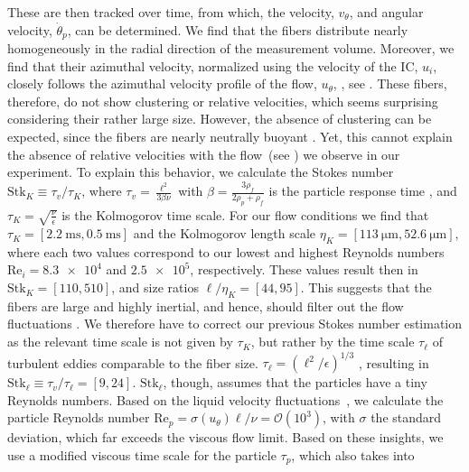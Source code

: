 These are then tracked over time,
from which, the velocity, $v_\theta$, and angular velocity,
$\dot{\theta}_p$, can be determined. We find that the fibers distribute nearly
homogeneously in the radial direction of the measurement volume. Moreover, we find that their
azimuthal velocity, normalized using the velocity of the IC,
$u_i$, closely follows the azimuthal velocity profile of the flow, $u_\theta$,
\cite{Huisman2013}, see . These fibers, therefore,
do not show clustering or relative velocities, which seems surprising
considering their rather large size.  However, the absence of clustering can
be expected, since the fibers are nearly neutrally buoyant
\cite{Calzavarini2008, Calzavarini2009, Fiabane2012}. Yet, this cannot explain
the absence of relative velocities with the flow~(see
) we observe in our experiment. To explain this
behavior, we calculate the Stokes number $\text{Stk}_K \equiv \tau_v/\tau_K$,
where $\tau_v = \frac{\ell^2}{3 \beta \nu}$ with $\beta =
\frac{3\rho_f}{2\rho_p + \rho_f}$ is the particle response time
\cite{Qureshi2007}, and $\tau_K = \sqrt{\frac{\nu}{\epsilon}}$ is the
Kolmogorov time scale. For our flow conditions we find that $\tau_K =
[\SI{2.2}{\milli\second},\SI{0.5}{\milli\second}]$ and the Kolmogorov length
scale $\eta_K = [\SI{113}{\micro\metre},\SI{52.6}{\micro\metre}]$, where each
two values correspond to our lowest and highest Reynolds numbers $\text{Re}_i
= \num{8.3e4}$ and $\num{2.5e5}$, respectively. These values result then in
$\text{Stk}_K = [110, 510]$, and size ratios $\ell/\eta_K = [44, 95]$. This
suggests that the fibers are large and highly inertial, and hence, should
filter out the flow fluctuations \cite{Calzavarini2009, Bec2010,
Marchioli2010, Parsa2011, Marchioli2013, Voth2017}.  We therefore have to
correct our previous Stokes number estimation as the relevant time scale is
not given by $\tau_K$, but rather by the time scale $\tau_\ell$ of turbulent
eddies comparable to the fiber size. $\tau_\ell = \left( \ell^2 / \epsilon
\right)^{1/3}$ \cite{Xu2008}, resulting in $\text{Stk}_\ell \equiv
\tau_v/\tau_\ell = [9, 24]$. $\text{Stk}_\ell$, though, assumes that the
particles have a tiny Reynolds numbers.  Based on the liquid velocity
fluctuations~\cite{Calzavarini2009}, we calculate the particle Reynolds number
$\text{Re}_p = \sigma(u_\theta) \ell / \nu = \mathcal{O}(10^3)$, with $\sigma$
the standard deviation, which far exceeds the viscous flow limit. Based on
these insights, we use a modified viscous time scale
\cite{Clift1978,Qureshi2007} for the particle $\tau_p$, which also takes into
